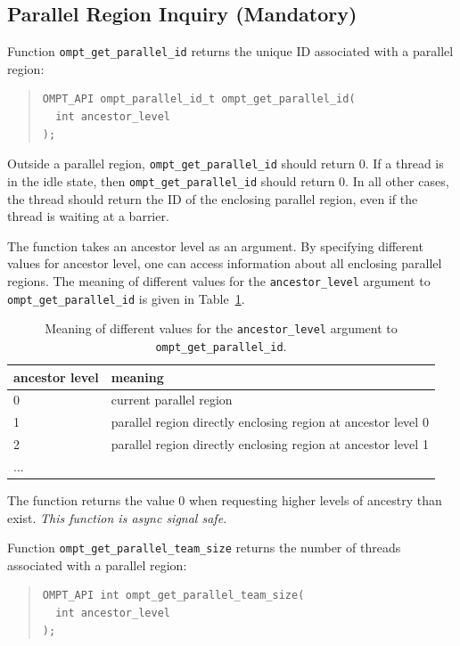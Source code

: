 \documentclass{article}
\begin{document}
\subsection{Parallel Region Inquiry (Mandatory)} 
\label{sec:parallel-inquiry} 
Function \verb|ompt_get_parallel_id| returns  
 the unique ID associated with a parallel region:
 
 
\begin{quote}
\begin{verbatim}
OMPT_API ompt_parallel_id_t ompt_get_parallel_id(
  int ancestor_level
);
\end{verbatim}
\end{quote}

\noindent 
Outside a parallel region, \verb|ompt_get_parallel_id| should return 0. If a thread is in the idle state, then \verb|ompt_get_parallel_id| should return 0.  
In all other cases, 
the thread should return the ID of the enclosing parallel region, even if the thread is waiting at a barrier.

The function takes an ancestor level as an argument. By specifying different values for
ancestor level, one can access information about all enclosing parallel regions. The meaning of different values for the \verb|ancestor_level| argument to \verb|ompt_get_parallel_id| is given in Table~\ref{tab:ancestor}.

\begin{table}
\centering
\begin{tabular}{|l|l|}
\hline
ancestor level  & meaning\\\hline
 0 & current parallel region  \\\hline
1 &parallel region directly enclosing region at ancestor level 0 \\\hline
2 & parallel region directly enclosing region at ancestor level 1 \\\hline
... & \\\hline
\end{tabular}
\caption{Meaning of different  values for the {\tt ancestor\_level} argument to {\tt ompt\_get\_parallel\_id}.}
\label{tab:ancestor}
\end{table}
 
 The function returns the value 0 when requesting higher levels of
 ancestry than exist.  {\em This function is async signal safe.}
 
 Function \verb|ompt_get_parallel_team_size| returns  
 the number of threads associated with a parallel region:
 
 
\begin{quote}
\begin{verbatim}
OMPT_API int ompt_get_parallel_team_size(
  int ancestor_level
);
\end{verbatim}
\end{quote}
\end{document}
